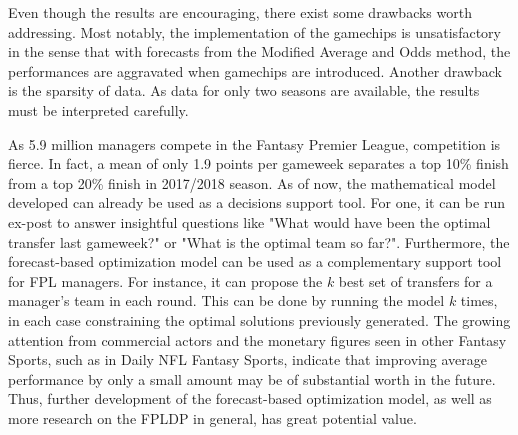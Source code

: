 \newpar

Even though the results are encouraging, there exist some drawbacks worth addressing. Most notably, the implementation of the gamechips is unsatisfactory in the sense that with forecasts from the Modified Average and Odds method, the performances are aggravated when gamechips are introduced. Another drawback is the sparsity of data. As data for only two seasons are available, the results must be interpreted carefully. 


\newpar

As 5.9 million managers compete in the Fantasy Premier League, competition is fierce. In fact, a mean of only 1.9 points per gameweek separates a top 10\% finish from a top 20\% finish in 2017/2018 season. As of now, the mathematical model developed can already be used as a decisions support tool. For one, it can be run ex-post to answer insightful questions like "What would have been the optimal transfer last gameweek?" or "What is the optimal team so far?". Furthermore, the forecast-based optimization model can be used as a complementary support tool for FPL managers. For instance, it can propose the $k$ best set of transfers for a manager's team in each round. This can be done by running the model $k$ times, in each case constraining the optimal solutions previously generated. The growing attention from commercial actors and the monetary figures seen in other Fantasy Sports, such as in Daily NFL Fantasy Sports, indicate that improving average performance by only a small amount may be of substantial worth in the future. Thus, further development of the forecast-based optimization model, as well as more research on the FPLDP in general, has great potential value.